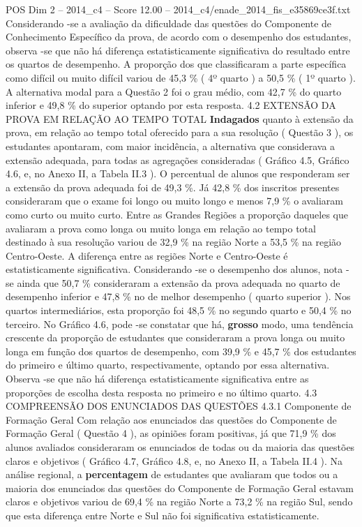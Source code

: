 \begin{textsample}{POS Dim 2 – 2014\_c4 – Score 12.00 – 2014\_c4/enade\_2014\_fis\_e35869ce3f.txt}
Considerando -se a avaliação da dificuldade das questões do Componente de Conhecimento Específico da prova, de acordo com o desempenho dos estudantes, observa -se que não há diferença estatisticamente significativa do resultado entre os quartos de desempenho.
A proporção dos que classificaram a parte específica como difícil ou muito difícil variou de 45,3 \% ( 4º quarto ) a 50,5 \% ( 1º quarto ).
A alternativa modal para a Questão 2 foi o grau médio, com 42,7 \% do quarto inferior e 49,8 \% do superior optando por esta resposta. 4.2 EXTENSÃO DA PROVA EM RELAÇÃO AO TEMPO TOTAL \textbf{Indagados} quanto à extensão da prova, em relação ao tempo total oferecido para a sua resolução ( Questão 3 ), os estudantes apontaram, com maior incidência, a alternativa que considerava a extensão adequada, para todas as agregações consideradas ( Gráfico 4.5, Gráfico 4.6, e, no Anexo II, a Tabela II.3 ).
O percentual de alunos que responderam ser a extensão da prova adequada foi de 49,3 \%.
Já 42,8 \% dos inscritos presentes consideraram que o exame foi longo ou muito longo e menos 7,9 \% o avaliaram como curto ou muito curto.
Entre as Grandes Regiões a proporção daqueles que avaliaram a prova como longa ou muito longa em relação ao tempo total destinado à sua resolução variou de 32,9 \% na região Norte a 53,5 \% na região Centro-Oeste.
A diferença entre as regiões Norte e Centro-Oeste é estatisticamente significativa.
Considerando -se o desempenho dos alunos, nota -se ainda que 50,7 \% consideraram a extensão da prova adequada no quarto de desempenho inferior e 47,8 \% no de melhor desempenho ( quarto superior ).
Nos quartos intermediários, esta proporção foi 48,5 \% no segundo quarto e 50,4 \% no terceiro.
No Gráfico 4.6, pode -se constatar que há, \textbf{grosso} modo, uma tendência crescente da proporção de estudantes que consideraram a prova longa ou muito longa em função dos quartos de desempenho, com 39,9 \% e 45,7 \% dos estudantes do primeiro e último quarto, respectivamente, optando por essa alternativa.
Observa -se que não há diferença estatisticamente significativa entre as proporções de escolha desta resposta no primeiro e no último quarto. 4.3 COMPREENSÃO DOS ENUNCIADOS DAS QUESTÕES 4.3.1 Componente de Formação Geral Com relação aos enunciados das questões do Componente de Formação Geral ( Questão 4 ), as opiniões foram positivas, já que 71,9 \% dos alunos avaliados consideraram os enunciados de todas ou da maioria das questões claros e objetivos ( Gráfico 4.7, Gráfico 4.8, e, no Anexo II, a Tabela II.4 ).
Na análise regional, a \textbf{percentagem} de estudantes que avaliaram que todos ou a maioria dos enunciados das questões do Componente de Formação Geral estavam claros e objetivos variou de 69,4 \% na região Norte a 73,2 \% na região Sul, sendo que esta diferença entre Norte e Sul não foi significativa estatisticamente.

\end{textsample}
